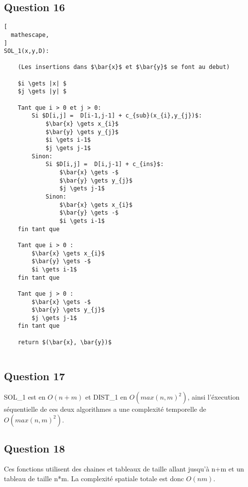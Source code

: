 \documentclass{report}
\begin{document}
\clearpage
\subsection*{Question 16}
\begin{lstlisting}[
  mathescape,
]
SOL_1(x,y,D):

    (Les insertions dans $\bar{x}$ et $\bar{y}$ se font au debut)
    
    $i \gets |x| $
    $j \gets |y| $

    Tant que i > 0 et j > 0:
        Si $D[i,j] =  D[i-1,j-1] + c_{sub}(x_{i},y_{j})$:
            $\bar{x} \gets x_{i}$
            $\bar{y} \gets y_{j}$
            $i \gets i-1$
            $j \gets j-1$
        Sinon:
            Si $D[i,j] =  D[i,j-1] + c_{ins}$:
                $\bar{x} \gets -$
                $\bar{y} \gets y_{j}$
                $j \gets j-1$
            Sinon:
                $\bar{x} \gets x_{i}$
                $\bar{y} \gets -$
                $i \gets i-1$
    fin tant que
                
    Tant que i > 0 :
        $\bar{x} \gets x_{i}$
        $\bar{y} \gets -$
        $i \gets i-1$
    fin tant que
        
    Tant que j > 0 :
        $\bar{x} \gets -$
        $\bar{y} \gets y_{j}$
        $j \gets j-1$
    fin tant que
    
    return $(\bar{x}, \bar{y})$
            
\end{lstlisting}

\clearpage

\subsection*{Question 17}
SOL\_1 est en $O(n+m)$ et DIST\_1 en $O(max(n,m)^{2})$, ainsi l'éxecution séquentielle de ces deux algorithmes a une complexité temporelle de  $O(max(n,m)^{2})$.

\subsection*{Question 18}
Ces fonctions utilisent des chaines et tableaux de taille allant jusqu'à n+m et un tableau de taille n*m. La complexité spatiale totale est donc $O(nm)$.
\end{document}
